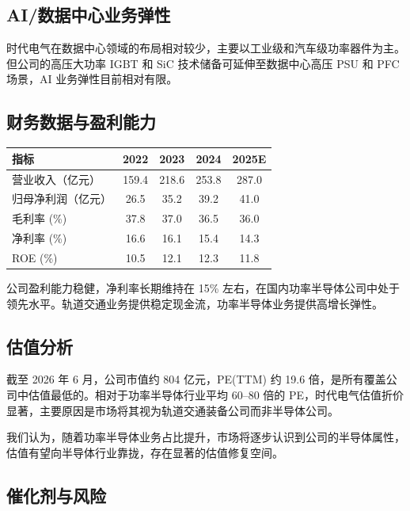 \subsection{AI/数据中心业务弹性}

时代电气在数据中心领域的布局相对较少，主要以工业级和汽车级功率器件为主。但公司的高压大功率 IGBT 和 SiC 技术储备可延伸至数据中心高压 PSU 和 PFC 场景，AI 业务弹性目前相对有限。

\subsection{财务数据与盈利能力}

\begin{exhibitbox}[表 6-2：时代电气核心财务数据]
\centering
\small
\begin{tabularx}{\textwidth}{X c c c c}
\toprule
\textbf{指标} & \textbf{2022} & \textbf{2023} & \textbf{2024} & \textbf{2025E} \\
\midrule
营业收入（亿元） & 159.4 & 218.6 & 253.8 & 287.0 \\
归母净利润（亿元） & 26.5 & 35.2 & 39.2 & 41.0 \\
毛利率 (\%) & 37.8 & 37.0 & 36.5 & 36.0 \\
净利率 (\%) & 16.6 & 16.1 & 15.4 & 14.3 \\
ROE (\%) & 10.5 & 12.1 & 12.3 & 11.8 \\
\bottomrule
\end{tabularx}
\end{exhibitbox}

公司盈利能力稳健，净利率长期维持在 15\% 左右，在国内功率半导体公司中处于领先水平。轨道交通业务提供稳定现金流，功率半导体业务提供高增长弹性。

\subsection{估值分析}

截至 2026 年 6 月，公司市值约 804 亿元，PE(TTM) 约 19.6 倍，是所有覆盖公司中估值最低的。相对于功率半导体行业平均 60–80 倍的 PE，时代电气估值折价显著，主要原因是市场将其视为轨道交通装备公司而非半导体公司。

我们认为，随着功率半导体业务占比提升，市场将逐步认识到公司的半导体属性，估值有望向半导体行业靠拢，存在显著的估值修复空间。

\subsection{催化剂与风险}

